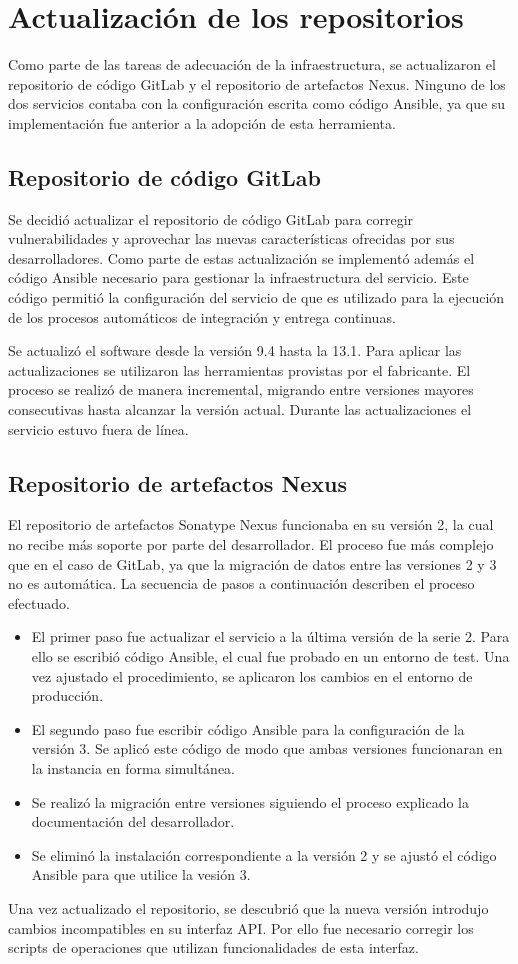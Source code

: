%
%
\section{Actualización de los repositorios}
%
Como parte de las tareas de adecuación de la infraestructura, se
actualizaron el repositorio de código GitLab y el repositorio de
artefactos Nexus. Ninguno de los dos servicios contaba con la
configuración escrita como código Ansible, ya que su implementación
fue anterior a la adopción de esta herramienta.
%
\subsection{Repositorio de código GitLab}
%
Se decidió actualizar el repositorio de código GitLab para corregir
vulnerabilidades y aprovechar las nuevas características ofrecidas por
sus desarrolladores. Como parte de estas actualización se implementó
además el código Ansible necesario para gestionar la infraestructura
del servicio. Este código permitió la configuración del servicio de
 que es utilizado para la ejecución de los procesos
automáticos de integración y entrega continuas.

Se actualizó el software desde la versión 9.4 hasta la 13.1. Para
aplicar las actualizaciones se utilizaron las herramientas provistas
por el fabricante. El proceso se realizó de manera incremental,
migrando entre versiones mayores consecutivas hasta alcanzar la
versión actual. Durante las actualizaciones el servicio estuvo fuera
de línea.
%
\subsection{Repositorio de artefactos Nexus}
%
El repositorio de artefactos Sonatype Nexus funcionaba en su versión
2, la cual no recibe más soporte por parte del desarrollador. El
proceso fue más complejo que en el caso de GitLab, ya que la migración
de datos entre las versiones 2 y 3 no es automática. La secuencia de
pasos a continuación describen el proceso efectuado.
%
\begin{itemize}
\item El primer paso fue actualizar el servicio a la última versión de
  la serie 2. Para ello se escribió código Ansible, el cual fue
  probado en un entorno de test. Una vez ajustado el procedimiento, se
  aplicaron los cambios en el entorno de producción.
\item El segundo paso fue escribir código Ansible para la
  configuración de la versión 3. Se aplicó este código de modo que
  ambas versiones funcionaran en la instancia en forma simultánea.
\item Se realizó la migración entre versiones siguiendo el proceso
  explicado la documentación del desarrollador.
\item Se eliminó la instalación correspondiente a la versión 2 y se
  ajustó el código Ansible para que utilice la vesión 3.
\end{itemize}
%
Una vez actualizado el repositorio, se descubrió que la nueva versión
introdujo cambios incompatibles en su interfaz API. Por ello fue
necesario corregir los scripts de operaciones que utilizan
funcionalidades de esta interfaz.
